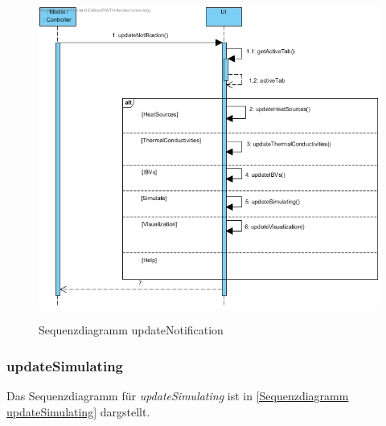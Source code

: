 \begin{figure}[H]
	\centering
	\includegraphics[scale=.6]{Bilder/UI__updateNotification().jpg}\\
	\caption{Sequenzdiagramm updateNotification}
	\label{Sequenzdiagramm updateNotification}
\end{figure}

\subsubsection*{updateSimulating}

Das Sequenzdiagramm für \emph{updateSimulating} ist in \ref{Sequenzdiagramm updateSimulating} dargstellt.

